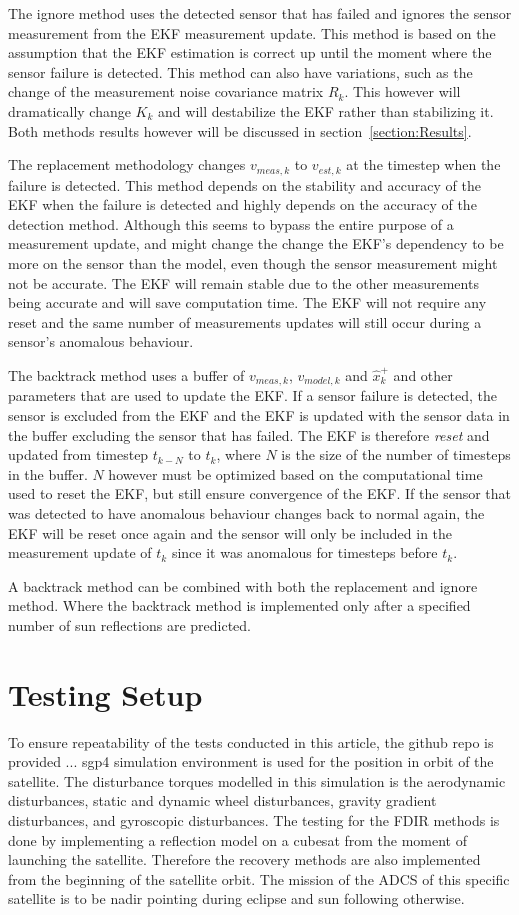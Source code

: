\documentclass[letterpaper, 10 pt, conference]{ieeeconf}  %
\begin{document}
The ignore method uses the detected sensor that has failed and ignores the sensor measurement from the EKF measurement update. This method is based on the assumption that the EKF estimation is correct up until the moment where the sensor failure is detected. This method can also have variations, such as the change of the measurement noise covariance matrix $R_k$. This however will dramatically change $K_k$ and will destabilize the EKF rather than stabilizing it. Both methods results however will be discussed in section~\ref{section:Results}.

The replacement methodology changes $v_{meas,k}$ to $v_{est,k}$ at the timestep when the failure is detected. This method depends on the stability and accuracy of the EKF when the failure is detected and highly depends on the accuracy of the detection method. Although this seems to bypass the entire purpose of a measurement update, and might change the change the EKF's dependency to be more on the sensor than the model, even though the sensor measurement might not be accurate. The EKF will remain stable due to the other measurements being accurate and will save computation time. The EKF will not require any reset and the same number of measurements updates will still occur during a sensor's anomalous behaviour.

The backtrack method uses a buffer of $v_{meas,k}$, $v_{model,k}$ and $\hat{x}_k^+$ and other parameters that are used to update the EKF. If a sensor failure is detected, the sensor is excluded from the EKF and the EKF is updated with the sensor data in the buffer excluding the sensor that has failed. The EKF is therefore \emph{reset} and updated from timestep $t_{k-N}$ to $t_k$, where $N$ is the size of the number of timesteps in the buffer. $N$ however must be optimized based on the computational time used to reset the EKF, but still ensure convergence of the EKF. If the sensor that was detected to have anomalous behaviour changes back to normal again, the EKF will be reset once again and the sensor will only be included in the measurement update of $t_k$ since it was anomalous for timesteps before $t_k$.

A backtrack method can be combined with both the replacement and ignore method. Where the backtrack method is implemented only after a specified number of sun reflections are predicted.

\section{Testing Setup}
To ensure repeatability of the tests conducted in this article, the github repo is provided ...
sgp4 simulation environment is used for the position in orbit of the satellite. The disturbance torques modelled in this simulation is the aerodynamic disturbances, static and dynamic wheel disturbances, gravity gradient disturbances, and gyroscopic disturbances. The testing for the FDIR methods is done by implementing a reflection model on a cubesat from the moment of launching the satellite. Therefore the recovery methods are also implemented from the beginning of the satellite orbit. The mission of the ADCS of this specific satellite is to be nadir pointing during eclipse and sun following otherwise.
\end{document}
